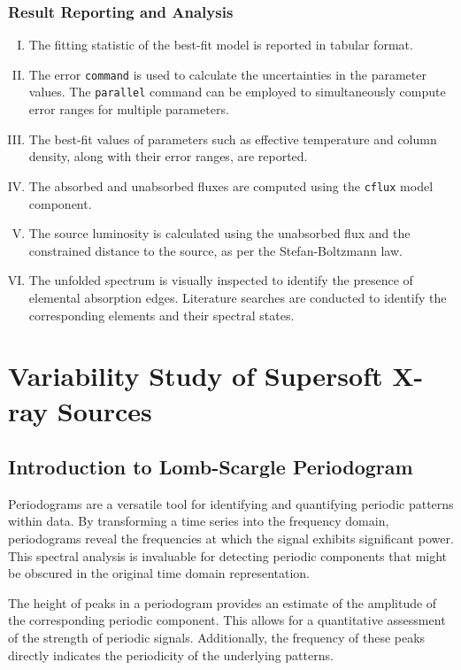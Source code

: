 			\subsubsection{Result Reporting and Analysis}
				\begin{enumerate}[I.]
					\item The fitting statistic of the best-fit model is reported in tabular format.
					\item The error \texttt{command} is used to calculate the uncertainties in the parameter values. The \texttt{parallel} command can be employed to simultaneously compute error ranges for multiple parameters.
					\item The best-fit values of parameters such as effective temperature and column density, along with their error ranges, are reported.
					\item The absorbed and unabsorbed fluxes are computed using the \texttt{cflux} model component.
					\item The source luminosity is calculated using the unabsorbed flux and the constrained distance to the source, as per the Stefan-Boltzmann law.
					\item The unfolded spectrum is visually inspected to identify the presence of elemental absorption edges. Literature searches are conducted to identify the corresponding elements and their spectral states.
				\end{enumerate}
			

    \section{Variability Study of Supersoft X-ray Sources} \label{methodology:variability}
    
    	\subsection{Introduction to Lomb-Scargle Periodogram}
    		Periodograms are a versatile tool for identifying and quantifying periodic patterns within data. By transforming a time series into the frequency domain, periodograms reveal the frequencies at which the signal exhibits significant power. This spectral analysis is invaluable for detecting periodic components that might be obscured in the original time domain representation.
    		
    		The height of peaks in a periodogram provides an estimate of the amplitude of the corresponding periodic component. This allows for a quantitative assessment of the strength of periodic signals. Additionally, the frequency of these peaks directly indicates the periodicity of the underlying patterns.
    		
